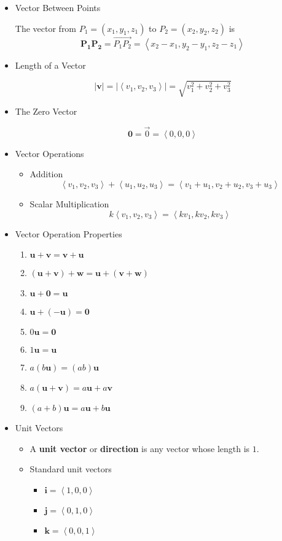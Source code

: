 \documentclass[12pt]{article}
\renewcommand{\vec}[1]{\mathbf{#1}}
\newcommand{\veci}{\mathbf{i}}
\newcommand{\vecj}{\mathbf{j}}
\newcommand{\veck}{\mathbf{k}}
\newcommand{\<}{\left<}
\renewcommand{\>}{\right>}
\begin{document}
\begin{itemize}
\begin{itemize}
  \item Vector Between Points
  
  The vector from $P_1 = (x_1,y_1,z_1)$ to $P_2 = (x_2,y_2,z_2)$ is \[\vec{P_1P_2} = \overrightarrow{P_1P_2} = \<x_2-x_1,y_2-y_1,z_2-z_1\>\]
  
  \item Length of a Vector
  
    \[|\vec{v}| = |\<v_1,v_2,v_3\>| = \sqrt{v_1^2 + v_2^2 + v_3^2}\]
  
  \item The Zero Vector
  
  \[\vec{0} = \overrightarrow{0} = \<0,0,0\>\]
  
  \item Vector Operations
    \begin{itemize}
    \item Addition
      \[\<v_1,v_2,v_3\> + \<u_1,u_2,u_3\> = \<v_1+u_1,v_2+u_2,v_3+u_3\>\]
    \item Scalar Multiplication
      \[k\<v_1,v_2,v_3\> = \<kv_1,kv_2,kv_3\> \]
    \end{itemize}

  \item Vector Operation Properties
    \begin{enumerate}
    \item $\vec{u}+\vec{v} = \vec{v}+\vec{u}$
    \item $(\vec{u}+\vec{v})+\vec{w} = \vec{u}+(\vec{v}+\vec{w})$
    \item $\vec{u}+\vec{0} = \vec{u}$
    \item $\vec{u}+(-\vec{u}) = \vec{0}$
    \item $0\vec{u} = \vec{0}$
    \item $1\vec{u} = \vec{u}$
    \item $a(b\vec{u}) = (ab)\vec{u}$
    \item $a(\vec{u} + \vec{v}) = a\vec{u} + a\vec{v}$
    \item $(a+b)\vec{u} = a\vec{u} + b\vec{u}$
    \end{enumerate}

  \item Unit Vectors
    \begin{itemize}
    \item A \textbf{unit vector} or \textbf{direction} is any vector whose length is $1$.
    
    \item Standard unit vectors
      \begin{itemize}
      \item $\veci = \<1,0,0\>$
      \item $\vecj = \<0,1,0\>$
      \item $\veck = \<0,0,1\>$
      \end{itemize}


\end{itemize}
\end{itemize}
\end{itemize}
\end{document}
